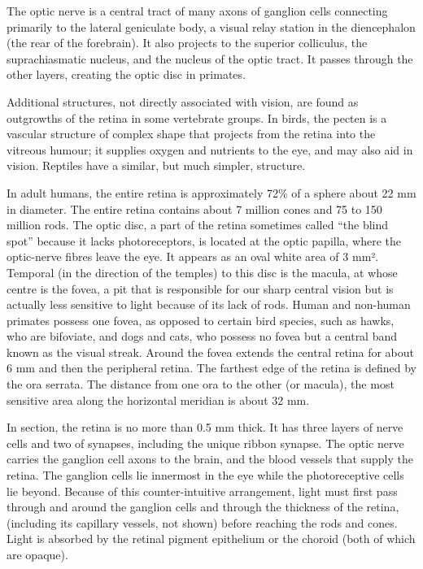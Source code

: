 \documentclass[]{book}
\begin{document}
The optic nerve is a central tract of many axons of ganglion cells connecting primarily to the lateral geniculate body, a visual relay station in the diencephalon (the rear of the forebrain). It also projects to the superior colliculus, the suprachiasmatic nucleus, and the nucleus of the optic tract. It passes through the other layers, creating the optic disc in primates.

Additional structures, not directly associated with vision, are found as outgrowths of the retina in some vertebrate groups. In birds, the pecten is a vascular structure of complex shape that projects from the retina into the vitreous humour; it supplies oxygen and nutrients to the eye, and may also aid in vision. Reptiles have a similar, but much simpler, structure.

In adult humans, the entire retina is approximately 72\% of a sphere about 22 mm in diameter. The entire retina contains about 7 million cones and 75 to 150 million rods. The optic disc, a part of the retina sometimes called ``the blind spot'' because it lacks photoreceptors, is located at the optic papilla, where the optic-nerve fibres leave the eye. It appears as an oval white area of 3 mm². Temporal (in the direction of the temples) to this disc is the macula, at whose centre is the fovea, a pit that is responsible for our sharp central vision but is actually less sensitive to light because of its lack of rods. Human and non-human primates possess one fovea, as opposed to certain bird species, such as hawks, who are bifoviate, and dogs and cats, who possess no fovea but a central band known as the visual streak. Around the fovea extends the central retina for about 6 mm and then the peripheral retina. The farthest edge of the retina is defined by the ora serrata. The distance from one ora to the other (or macula), the most sensitive area along the horizontal meridian is about 32 mm.

In section, the retina is no more than 0.5 mm thick. It has three layers of nerve cells and two of synapses, including the unique ribbon synapse. The optic nerve carries the ganglion cell axons to the brain, and the blood vessels that supply the retina. The ganglion cells lie innermost in the eye while the photoreceptive cells lie beyond. Because of this counter-intuitive arrangement, light must first pass through and around the ganglion cells and through the thickness of the retina, (including its capillary vessels, not shown) before reaching the rods and cones. Light is absorbed by the retinal pigment epithelium or the choroid (both of which are opaque).
\end{document}
